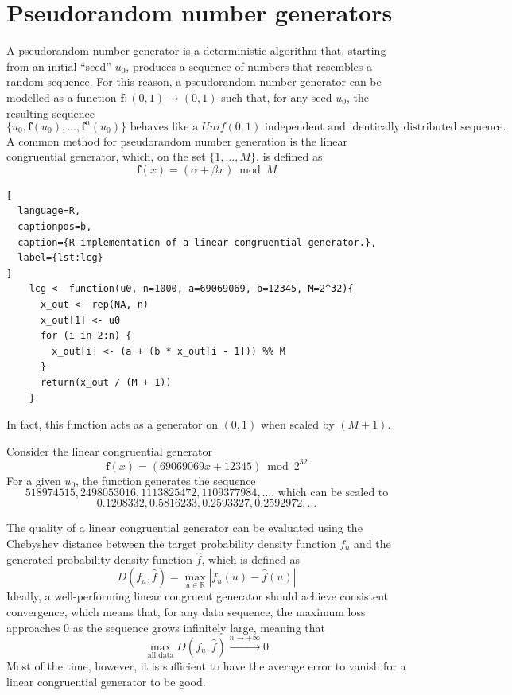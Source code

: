 \documentclass{report}
\begin{document}
\section{Pseudorandom number generators}
A pseudorandom number generator is a deterministic algorithm that, starting from an initial ``seed'' $\displaystyle u_0$, produces a sequence of numbers that resembles a random sequence. \newline
For this reason, a pseudorandom number generator can be modelled as a function $\displaystyle \mathbf{f}: (0, 1) \to (0, 1)$ such that, for any seed $\displaystyle u_0$, the resulting sequence
\[\{u_0, \mathbf{f}(u_0), \dots, \mathbf{f}^n(u_0)\} \text{ behaves like a $Unif(0, 1)$ independent and identically distributed sequence.}\]
A common method for pseudorandom number generation is the linear congruential generator, which, on the set $\displaystyle \{1, \dots, M\}$, is defined as
\[\mathbf{f}(x) = (\alpha + \beta x) \bmod M\]
\begin{lstlisting}[
  language=R,
  captionpos=b,
  caption={R implementation of a linear congruential generator.},
  label={lst:lcg}
]
    lcg <- function(u0, n=1000, a=69069069, b=12345, M=2^32){
      x_out <- rep(NA, n)
      x_out[1] <- u0
      for (i in 2:n) {
        x_out[i] <- (a + (b * x_out[i - 1])) %% M
      }
      return(x_out / (M + 1))
    }
\end{lstlisting}
\noindent In fact, this function acts as a generator on $ \displaystyle (0, 1)$ when scaled by $\displaystyle (M + 1)$.
\begin{examplebox}
    Consider the linear congruential generator
    \[\mathbf{f}(x) = (69069069x + 12345) \bmod 2^{32}\]
    For a given $\displaystyle u_0$, the function generates the sequence
    \[518974515, 2498053016, 1113825472, 1109377984, \dots \text{, which can be scaled to}\]
    \[0.1208332, 0.5816233, 0.2593327, 0.2592972, \dots\]
\end{examplebox}
\noindent The quality of a linear congruential generator can be evaluated using the Chebyshev distance between the target probability density function $\displaystyle f_u$ and the generated probability density function $\displaystyle \hat{f}$, which is defined as
\[D(f_u, \hat{f}) = \max_{u \in \mathbb{R}} |f_u(u) - \hat{f}(u)|\]
Ideally, a well-performing linear congruent generator should achieve consistent convergence, which means that, for any data sequence, the maximum loss approaches $\displaystyle 0$ as the sequence grows infinitely large, meaning that
\[\max_{\text{all data}} D(f_u, \hat{f}) \xrightarrow{n \to +\infty} 0\]
Most of the time, however, it is sufficient to have the average error to vanish for a linear congruential generator to be good.
\end{document}
